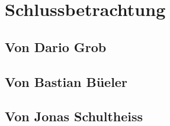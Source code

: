\chapter{Schlussbetrachtung}
\section{Von Dario Grob}
\lipsum[4-8][32-64]
\section{Von Bastian Büeler}
\lipsum[4-8][32-64]
\section{Von Jonas Schultheiss}
\lipsum[4-8][32-64]